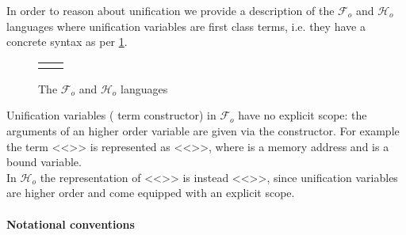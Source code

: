 \documentclass[sigconf,natbib=false,review]{acmart}
\newcommand{\Fo}{\ensuremath{\mathcal{F}_{\!o}\xspace}} %
\newcommand{\Ho}{\ensuremath{\mathcal{H}_o}\xspace}
\begin{document}
In order to reason about unification we provide a description of the
\Fo{} and \Ho languages where unification variables
are first class terms, i.e. they have a concrete syntax as
per \cref{code:common-terms}.
%
{
\setlength{\abovecaptionskip}{0pt}
\setlength{\belowcaptionskip}{-13pt}
\begin{figure} %
  \begin{tabular}{ll}
  \begin{minipage}{0.21\textwidth}
   {code/fo_tm}
  \end{minipage}
  &
  \begin{minipage}{0.24\textwidth}
   {code/ho_tm}
  \end{minipage}
  \end{tabular}\vspace{4pt}
  \caption{The \Fo{} and \Ho languages}\vspace{0.3em}
  \label{code:common-terms}
\end{figure}
}
Unification variables ( term constructor)
in \Fo{} have no explicit scope:
the arguments of an higher order variable are given via the 
constructor. For example the term <<>> is represented as
<<>>, where  is a memory address and
 is a bound variable.\\
In \Ho the representation of <<>> is instead <<>>,
since unification variables are higher order and come equipped with an
explicit scope.
%

\paragraph{Notational conventions}
\end{document}
